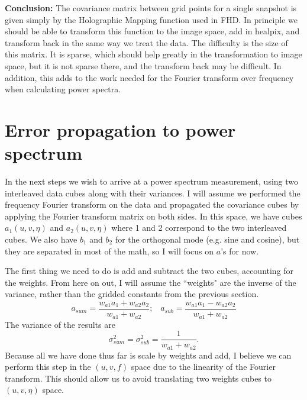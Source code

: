 \documentclass{article}
\begin{document}
{\bf Conclusion:} The covariance matrix between grid points for a single snapshot is given simply by the Holographic Mapping function used in FHD. In principle we should be able to transform this function to the image space, add in healpix, and transform back in the same way we treat the data. The difficulty is the size of this matrix. It is sparse, which should help greatly in the transformation to image space, but it is not sparse there, and the transform back may be difficult. In addition, this adds to the work needed for the Fourier transform over frequency when calculating power spectra.

\section{Error propagation to power spectrum}

In the next steps we wish to arrive at a power spectrum measurement, using two interleaved data cubes along with their variances. I will assume we performed the frequency Fourier transform on the data and propagated the covariance cubes by applying the Fourier transform matrix on both sides. In this space, we have cubes $a_1(u,v,\eta)$ and $a_2(u,v,\eta)$ where 1 and 2 correspond to the two interleaved cubes. We also have $b_1$ and $b_2$ for the orthogonal mode (e.g. sine and cosine), but they are separated in most of the math, so I will focus on $a$'s for now.

The first thing we need to do is add and subtract the two cubes, accounting for the weights. From here on out, I will assume the ``weights" are the inverse of the variance, rather than the gridded constants from the previous section.
\begin{equation}
a_{sum} = \frac{w_{a1}a_1 +w_{a2} a_2}{w_{a1}+w_{a2}} ; \; \; \;
a_{sub} = \frac{w_{a1}a_1 -w_{a2} a_2}{w_{a1}+w_{a2}} 
\end{equation}
The variance of the results are
\begin{equation}
\sigma^2_{sum} = \sigma^2_{sub} = \frac{1}{w_{a1} + w_{a2}}.
\end{equation}
Because all we have done thus far is scale by weights and add, I believe we can perform this step in the $(u,v,f)$ space due to the linearity of the Fourier transform. This should allow us to avoid translating two weights cubes to $(u,v,\eta)$ space.
\end{document}
